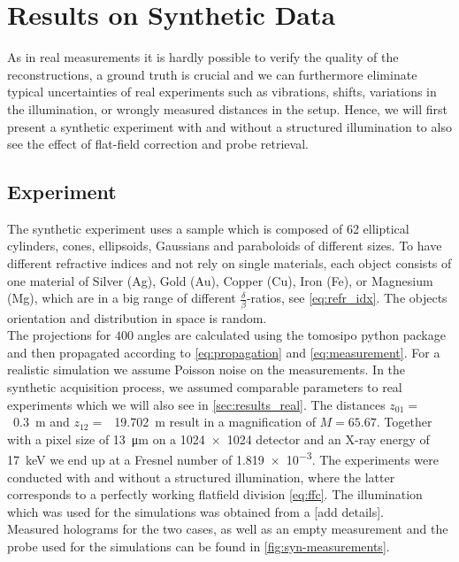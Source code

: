 \section{Results on Synthetic Data} \label{sec:results_syn}

As in real measurements it is hardly possible to verify the quality of the reconstructions, a ground truth is crucial and we can furthermore eliminate typical uncertainties of real experiments such as vibrations, shifts, variations in the illumination, or wrongly measured distances in the setup.
Hence, we will first present a synthetic experiment with and without a structured illumination to also see the effect of flat-field correction and probe retrieval. 

\subsection{Experiment} \label{subsec:results_syn_experiment}
The synthetic experiment uses a sample which is composed of 62 elliptical cylinders, cones, ellipsoids, Gaussians and paraboloids of different sizes. To have different refractive indices and not rely on single materials, each object consists of one material of Silver (Ag), Gold (Au), Copper (Cu), Iron (Fe), or Magnesium (Mg), which are in a big range of different \( \frac{\delta}{\beta} \)-ratios, see \eqref{eq:refr_idx}.
The objects orientation and distribution in space is random.\\
The projections for \( 400 \) angles are calculated using the tomosipo python package \cite{hendriksen-2021-tomos} and then propagated according to \eqref{eq:propagation} and \eqref{eq:measurement}.
For a realistic simulation we assume Poisson noise on the measurements.
In the synthetic acquisition process, we assumed comparable parameters to real experiments which we will also see in \cref{sec:results_real}.
The distances \( z_{01}=~\)~\qty{0.3}{\m} and \( z_{12}=~\)~\qty{19.702}{\m} result in a magnification of \( M = 65.67 \).
Together with a pixel size of \qty{13}{\um} on a \qty{1024}{\px}~\(\times\)~\qty{1024}{\px} detector and an X-ray energy of \qty{17}{\keV} we end up at a Fresnel number of \num{1.819e-3}.
The experiments were conducted with and without a structured illumination, where the latter corresponds to a perfectly working flatfield division \eqref{eq:ffc}.
The illumination which was used for the simulations was obtained from a [add details].\\
Measured holograms for the two cases, as well as an empty measurement and the probe used for the simulations can be found in \cref{fig:syn-measurements}.
